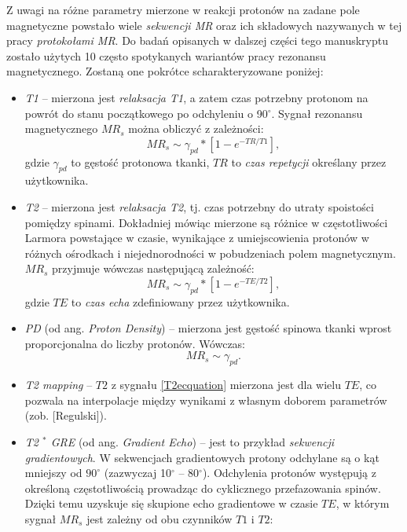 Z uwagi na różne parametry mierzone w reakcji protonów na zadane pole magnetyczne powstało wiele \textit{sekwencji MR} oraz ich składowych nazywanych w tej pracy \textit{protokołami MR}. Do badań opisanych w dalszej części tego manuskryptu zostało użytych 10 często spotykanych wariantów pracy rezonansu magnetycznego. Zostaną one pokrótce scharakteryzowane poniżej:
\begin{itemize}
	\item \textit{T1} -- mierzona jest \textit{relaksacja T1}, a zatem czas potrzebny protonom na powrót do stanu początkowego po odchyleniu o 90$^\circ$. Sygnał rezonansu magnetycznego $MR_s$ można obliczyć z zależności:
	\begin{equation}
		MR_s \sim \gamma_{pd} \ast [1-e^{-TR/T1}],
	\end{equation}
	gdzie $\gamma_{pd}$ to gęstość protonowa tkanki, $TR$ to \textit{czas repetycji} określany przez użytkownika.
	\item \textit{T2} -- mierzona jest \textit{relaksacja T2}, tj. czas potrzebny do utraty spoistości pomiędzy spinami. Dokładniej mówiąc mierzone są różnice w częstotliwości Larmora powstające w czasie, wynikające z umiejscowienia protonów w różnych ośrodkach i niejednorodności w pobudzeniach polem magnetycznym. $MR_s$ przyjmuje wówczas następującą zależność:
	\begin{equation}
	\label{T2ecquation}
	MR_s \sim \gamma_{pd} \ast [1-e^{-TE/T2}],
	\end{equation}
	gdzie $TE$ to \textit{czas echa} zdefiniowany przez użytkownika.
	\item \textit{PD} (od ang. \textit{Proton Density}) -- mierzona jest gęstość spinowa tkanki wprost proporcjonalna do liczby protonów. Wówczas:
	\begin{equation}
	MR_s \sim \gamma_{pd}.
	\end{equation}
	\item \textit{T2 mapping} -- $T2$ z sygnału \ref{T2ecquation} mierzona jest dla wielu $TE$, co pozwala na interpolacje między wynikami z własnym doborem parametrów (zob. [Regulski]).
	\item \textit{T2 $^\ast$ GRE} (od ang. \textit{Gradient Echo}) -- jest to przykład \textit{sekwencji gradientowych}. W sekwencjach gradientowych protony odchylane są o kąt mniejszy od $90^\circ$ (zazwyczaj 10$^\circ$ -- 80$^\circ$). Odchylenia protonów występują z określoną częstotliwością prowadząc do cyklicznego przefazowania spinów. Dzięki temu uzyskuje się skupione echo gradientowe w czasie $TE$, w którym sygnał $MR_s$ jest zależny od obu czynników $T1$ i $T2$:

\end{itemize}
